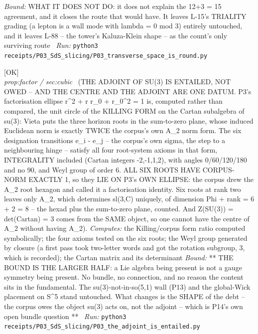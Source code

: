 \begin{description}
 \emph{Bound:} WHAT IT DOES NOT DO: it does not explain the 12+3 = 15 agreement, and it closes the route that would have. It leaves L-15's TRIALITY grading (a lepton is a wall mode with lambda = 0 mod 3) entirely untouched, and it leaves L-88 -- the tower's Kaluza-Klein shape -- as the count's only surviving route
\ \emph{Run:} \texttt{python3 receipts/P03\_SdS\_slicing/P03\_transverse\_space\_is\_round.py}
\item[\label{rcpt:P03_the_adjoint_is_entailed}\texttt{P03\_the\_adjoint\_is\_entailed}]\hfill\textsf{[OK]}\\
\textit{prop:factor / sec:cubic} \ (THE ADJOINT OF SU(3) IS ENTAILED, NOT OWED -- AND THE CENTRE AND THE ADJOINT ARE ONE DATUM. P3's factorisation ellipse r\textasciicircum{}2 + r r\_0 + r\_0\textasciicircum{}2 = 1 is, computed rather than compared, the unit circle of the KILLING FORM on the Cartan subalgebra of su(3): Vieta puts the three horizon roots in the sum-to-zero plane, whose induced Euclidean norm is exactly TWICE the corpus's own A\_2 norm form. The six designation transitions e\_i - e\_j -- the corpus's own sigma, the step to a neighbouring hinge -- satisfy all four root-system axioms in that form, INTEGRALITY included (Cartan integers -2,-1,1,2), with angles 0/60/120/180 and no 90, and Weyl group of order 6. ALL SIX ROOTS HAVE CORPUS-NORM EXACTLY 1, so they LIE ON P3's OWN ELLIPSE: the corpus drew the A\_2 root hexagon and called it a factorisation identity. Six roots at rank two leaves only A\_2, which determines sl(3,C) uniquely, of dimension \textbar{}Phi\textbar{} + rank = 6 + 2 = 8 -- the hexad plus the sum-to-zero plane, counted. And \textbar{}Z(SU(3))\textbar{} = det(Cartan) = 3 comes from the SAME object, so one cannot have the centre of A\_2 without having A\_2). 
\emph{Computes:} the Killing/corpus form ratio computed symbolically; the four axioms tested on the six roots; the Weyl group generated by closure (a first pass took two-letter words and got the rotation subgroup, 3, which is recorded); the Cartan matrix and its determinant
 \emph{Bound:} ** THE BOUND IS THE LARGER HALF: a Lie algebra being present is not a gauge symmetry being present. No bundle, no connection, and no reason the content sits in the fundamental. The su(3)-not-in-so(5,1) wall (P13) and the global-Wick placement on S\textasciicircum{}5 stand untouched. What changes is the SHAPE of the debt -- the corpus owes the object su(3) acts on, not the adjoint -- which is P14's own open bundle question **
\ \emph{Run:} \texttt{python3 receipts/P03\_SdS\_slicing/P03\_the\_adjoint\_is\_entailed.py}

\end{description}
